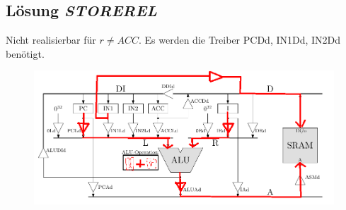 \documentclass{scrartcl}[9pt, a4paper]
\begin{document}
\subsection*{Lösung \emph{STOREREL}}

Nicht realisierbar für $r \neq ACC$. Es werden die Treiber PCDd, IN1Dd, IN2Dd benötigt.

\begin{figure}[h]
	\centering
	\includegraphics[width=.8\textwidth]{figs/reti}
\end{figure}
\end{document}
